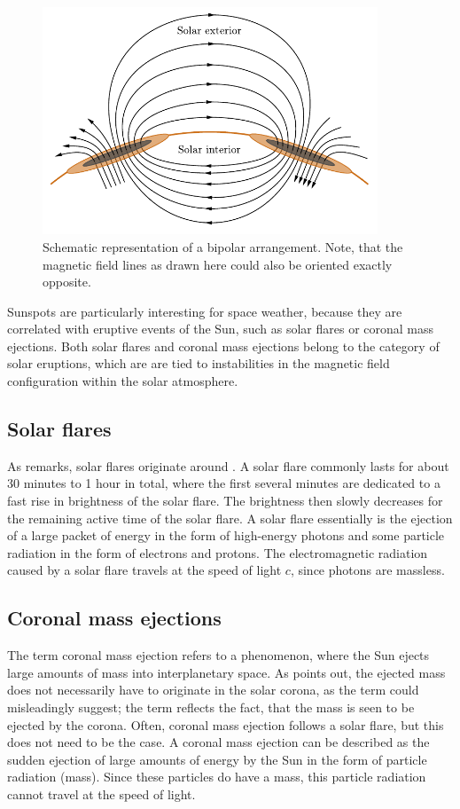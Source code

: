\documentclass[a4paper,12pt]{report}
\def\lk#1{{\color{black}{#1}}}
\begin{document}
\begin{figure}[h]
\centering
\includegraphics[width=10cm]{figures/bipolarSunspots.pdf}
\caption{Schematic representation of a bipolar \lk{sunspot} arrangement. Note, that the magnetic field lines as drawn here could also be oriented exactly opposite.}
\label{fig:bipolarSunspots}
\end{figure}
Sunspots are particularly interesting for space weather, because they are correlated with eruptive events of the Sun, such as solar flares or coronal mass ejections. Both solar flares and coronal mass ejections belong to the category of solar eruptions, which are are tied to instabilities in the magnetic field configuration within the solar atmosphere.

\subsection{Solar flares}
As \cite[p.432]{Stix.2002} remarks, solar flares \lk{mostly} originate around \lk{sun-spots}. A solar flare commonly lasts for about 30 minutes to 1 hour in total, where the first several minutes are dedicated to a fast rise in brightness of the solar flare. The brightness then slowly decreases for the remaining active time of the solar flare. A solar flare essentially is the ejection of a large packet of energy in the form of high-energy photons and some particle radiation in the form of electrons and protons. The electromagnetic radiation caused by a solar flare travels at the speed of light $c$, since photons are massless.

\subsection{Coronal mass ejections}
The term coronal mass ejection refers to a phenomenon, where the Sun ejects large amounts of mass into interplanetary space. As \cite[p.436]{Stix.2002} points out, the ejected mass does not necessarily have to originate in the solar corona, as the term could misleadingly suggest; the term reflects the fact, that the mass is seen to be ejected by the corona. Often, \lk{a} coronal mass ejection follows a solar flare, but this does not need to be the case. A coronal mass ejection can be described as the sudden ejection of large amounts of energy by the Sun in the form of particle radiation (mass). Since these particles do have a mass, this particle radiation cannot travel at the speed of light.
\end{document}
